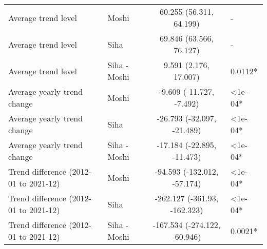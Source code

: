 \begin{longtable}{l|lcl}
\midrule\addlinespace[2.5pt]
\multicolumn{4}{l}{Vector-borne Infections} \\[2.5pt] 
\midrule\addlinespace[2.5pt]
Average trend level & Moshi & 60.255 (56.311, 64.199) & - \\ 
Average trend level & Siha & 69.846 (63.566, 76.127) & - \\ 
Average trend level & Siha - Moshi & 9.591 (2.176, 17.007) & 0.0112* \\ 
Average yearly trend change & Moshi & -9.609 (-11.727, -7.492) & <1e-04* \\ 
Average yearly trend change & Siha & -26.793 (-32.097, -21.489) & <1e-04* \\ 
Average yearly trend change & Siha - Moshi & -17.184 (-22.895, -11.473) & <1e-04* \\ 
Trend difference (2012-01 to 2021-12) & Moshi & -94.593 (-132.012, -57.174) & <1e-04* \\ 
Trend difference (2012-01 to 2021-12) & Siha & -262.127 (-361.93, -162.323) & <1e-04* \\ 
Trend difference (2012-01 to 2021-12) & Siha - Moshi & -167.534 (-274.122, -60.946) & 0.0021* \\ 
\bottomrule
\end{longtable}
\endgroup

